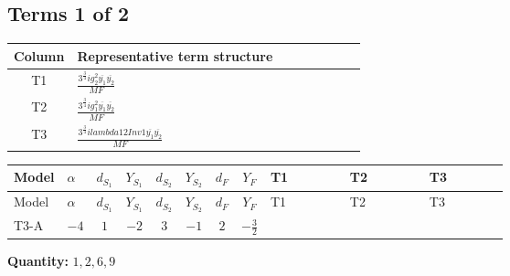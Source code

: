 \documentclass[8pt]{article}
\begin{document}
\begin{landscape}
\subsection*{Terms 1 of 2}
\begin{center}
\begin{tabular}{@{}c >{\raggedright\arraybackslash}p{0.82\linewidth}@{}}
\toprule
Column & Representative term structure \\
\midrule
T1 & \(\displaystyle \frac{3^{\frac{3}{4}} i g_{2}^{2} \overline{y_{1}} \overline{y_{2}}}{MF}\) \\
\midrule
T2 & \(\displaystyle \frac{3^{\frac{3}{4}} i g_{1}^{2} \overline{y_{1}} \overline{y_{2}}}{MF}\) \\
\midrule
T3 & \(\displaystyle \frac{3^{\frac{3}{4}} i lambda12Inv1 \overline{y_{1}} \overline{y_{2}}}{MF}\) \\
\midrule
\bottomrule
\end{tabular}
\end{center}
\smallskip
\tiny
\begin{longtable}{@{}llcccccc >{\raggedright\arraybackslash}p{0.21\linewidth} >{\raggedright\arraybackslash}p{0.21\linewidth} >{\raggedright\arraybackslash}p{0.21\linewidth}@{}}
\toprule
Model & $\alpha$ & $d_{S_1}$ & $Y_{S_1}$ & $d_{S_2}$ & $Y_{S_2}$ & $d_F$ & $Y_F$ & T1 & T2 & T3 \\
\midrule
\endfirsthead
\toprule
Model & $\alpha$ & $d_{S_1}$ & $Y_{S_1}$ & $d_{S_2}$ & $Y_{S_2}$ & $d_F$ & $Y_F$ & T1 & T2 & T3 \\
\midrule
\endhead
T3-A & $-4$ & $1$ & $-2$ & $3$ & $-1$ & $2$ & $-\frac{3}{2}$ & \scriptsize\adjustbox{max width=\linewidth}{$\begin{gathered} - \frac{25 \cdot 3^{\frac{3}{4}} i g_{2}^{2} \overline{y_{1}} \overline{y_{2}}}{24 MF}\end{gathered}$} & \scriptsize\adjustbox{max width=\linewidth}{$\begin{gathered} - \frac{9 \cdot 3^{\frac{3}{4}} i g_{1}^{2} \overline{y_{1}} \overline{y_{2}}}{8 MF}\end{gathered}$} & \scriptsize\adjustbox{max width=\linewidth}{$\begin{gathered} - \frac{3^{\frac{3}{4}} i lambda12Inv1 \overline{y_{1}} \overline{y_{2}}}{6 MF}\end{gathered}$} \\
\midrule
\bottomrule
\end{longtable}
\clearpage
\noindent\textbf{Quantity: }$\mathrm{1,2,6,9}$\par\smallskip

\end{landscape}
\end{document}
